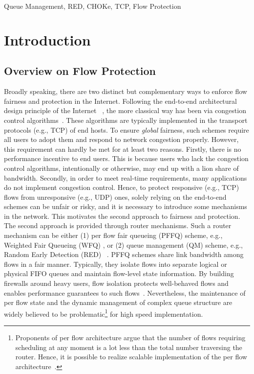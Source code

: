 \documentclass{IEEEtran}
\begin{document}
\begin{keywords} Queue Management, RED, CHOKe, TCP, Flow Protection \end{keywords}

\section{Introduction}\label{sec:intro}

\subsection{Overview on Flow Protection}

Broadly speaking, there are two distinct but complementary ways to enforce flow fairness and protection in the Internet. Following the end-to-end architectural design principle of the Internet ~\cite{e2eArgument84}, the more classical way has been via congestion control algorithms~\cite{RFC5681}. These algorithms are typically implemented in the transport protocols (e.g., TCP) of end hosts. To ensure \emph{global} fairness, such schemes require all users to adopt them and respond to network congestion properly. However, this requirement can hardly be met for at least two reasons. Firstly, there is no performance incentive to end users. This is because users who lack the congestion control algorithms, intentionally or otherwise, may end up with a lion share of bandwidth. Secondly, in order to meet real-time requirements, many applications do not implement congestion control. Hence, to protect responsive (e.g., TCP) flows from unresponsive (e.g., UDP) ones, solely relying on the end-to-end schemes can be unfair or risky, and it is necessary to introduce some mechanisms in the network. This motivates the second approach to fairness and protection. 
The second approach is provided through router mechanisms. Such a router mechanism can be either (1) per flow fair queueing (PFFQ) scheme,  e.g., Weighted Fair Queueing (WFQ) \cite{demersWFQ89}, or (2) queue management (QM) scheme, e.g., Random Early Detection (RED) ~\cite{REDfloyd93,adaptiveRED2001}. PFFQ schemes share link bandwidth among flows in a fair manner. Typically, they isolate flows into separate logical or physical FIFO queues and maintain flow-level state information. By building firewalls around heavy users, flow isolation protects well-behaved flows and enables performance guarantees to such flows~\cite{keshavBook97}. Nevertheless, the maintenance of per flow state and the dynamic management of complex queue structure are widely believed to be problematic\footnote{Proponents of per flow architecture argue that the number of flows requiring scheduling at any moment is a lot less than the total number traversing the router. Hence, it is possible to realize scalable implementation of the per flow architecture~\cite{kortebiSIGMETRICS05, flowBufferJSAC99, esheteAFpFT11, perFlowDQS07}.} for high speed implementation.
\end{document}
